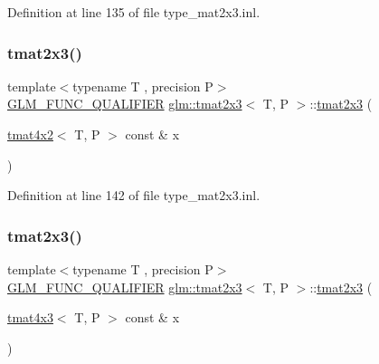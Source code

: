 Definition at line 135 of file type\+\_\+mat2x3.\+inl.

\mbox{\label{structglm_1_1tmat2x3_a0e17446454497d323a6f1dc09a68ea5f}} 
\subsubsection{\texorpdfstring{tmat2x3()}{tmat2x3()}\hspace{0.1cm}{\footnotesize\ttfamily [17/22]}}
{\footnotesize\ttfamily template$<$typename T , precision P$>$ \\
\mbox{\hyperlink{setup_8hpp_a33fdea6f91c5f834105f7415e2a64407}{G\+L\+M\+\_\+\+F\+U\+N\+C\+\_\+\+Q\+U\+A\+L\+I\+F\+I\+ER}} \mbox{\hyperlink{structglm_1_1tmat2x3}{glm\+::tmat2x3}}$<$ T, P $>$\+::\mbox{\hyperlink{structglm_1_1tmat2x3}{tmat2x3}} (\begin{DoxyParamCaption}\item[{\mbox{\hyperlink{structglm_1_1tmat4x2}{tmat4x2}}$<$ T, P $>$ const \&}]{x }\end{DoxyParamCaption})}



Definition at line 142 of file type\+\_\+mat2x3.\+inl.

\mbox{\label{structglm_1_1tmat2x3_a1c167271dd959e664021e1accd456bf1}} 
\subsubsection{\texorpdfstring{tmat2x3()}{tmat2x3()}\hspace{0.1cm}{\footnotesize\ttfamily [18/22]}}
{\footnotesize\ttfamily template$<$typename T , precision P$>$ \\
\mbox{\hyperlink{setup_8hpp_a33fdea6f91c5f834105f7415e2a64407}{G\+L\+M\+\_\+\+F\+U\+N\+C\+\_\+\+Q\+U\+A\+L\+I\+F\+I\+ER}} \mbox{\hyperlink{structglm_1_1tmat2x3}{glm\+::tmat2x3}}$<$ T, P $>$\+::\mbox{\hyperlink{structglm_1_1tmat2x3}{tmat2x3}} (\begin{DoxyParamCaption}\item[{\mbox{\hyperlink{structglm_1_1tmat4x3}{tmat4x3}}$<$ T, P $>$ const \&}]{x }\end{DoxyParamCaption})}



